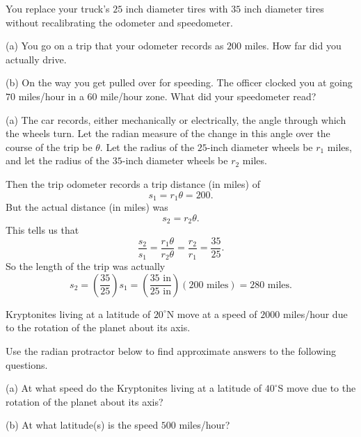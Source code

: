 \documentclass{ximera}
\begin{document}
\begin{question}  \label{Q6521:Angles}
You replace  your truck's $25$ inch diameter tires with $35$ inch diameter tires without recalibrating the odometer and speedometer.

(a) You go on a trip that your odometer records as $200$ miles. How far did you actually drive.

(b) On the way you get pulled over for speeding. The officer clocked you at going $70$ miles/hour in a $60$ mile/hour zone. What did your speedometer read?

\begin{hint}
(a) The car records, either mechanically or electrically, the angle through which the wheels turn. Let the radian measure of the change in this angle over the course of the trip be $\theta$. Let the radius of the $25$-inch diameter wheels be $r_1$ miles, and let the radius of the $35$-inch diameter wheels be $r_2$ miles. 

Then the trip odometer records a trip distance (in miles) of 
\[
   s_1 = r_1\theta =200.
\]
But the actual distance (in miles) was
\[
  s_2 = r_2\theta .
\]
This tells us that
\[
    \frac{s_2}{s_1} = \frac{r_1\theta}{r_2 \theta} = \frac{r_2}{r_1} = \frac{35}{25}.
\]
So the length of the trip was actually
\[
   s_2 = \left( \frac{35}{25}\right) s_1 = \left(\frac{35\text{ in}}{25\text{ in}} \right) (200 \text{ miles}) = 280 \text{ miles}.
\]
\end{hint}

\end{question}


\begin{question} \label{Q6721:Angles}
Kryptonites living at a latitude of $20^\circ$N move at a speed of $2000$ miles/hour due to the rotation of the planet about its axis.

Use the radian protractor below to find approximate answers to the following questions.

(a) At what speed do the Kryptonites living at a latitude of $40^\circ$S move due to the rotation of the planet about its axis?

(b) At what latitude(s) is the speed $500$ miles/hour?

\begin{exploration}
 
\begin{onlineOnly}
    \begin{center}
\end{center}
\end{onlineOnly}
\end{exploration}

\end{question}
\end{document}
